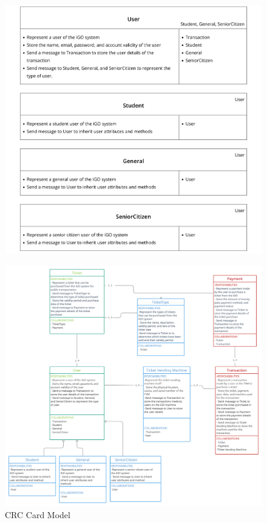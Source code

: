 \documentclass[a4paper, 11pt]{report}
\begin{document}
\begin{figure}[h]
  \includegraphics[width=\textwidth]{CRC-2.png}   
\end{figure}
\clearpage
\begin{figure}[h]
\renewcommand{\thefigure}{6.2.1}
    \centering
    \includegraphics[width=\textwidth]{CRC card model.png}
    \caption{CRC Card Model}
     
\end{figure}
\end{document}
